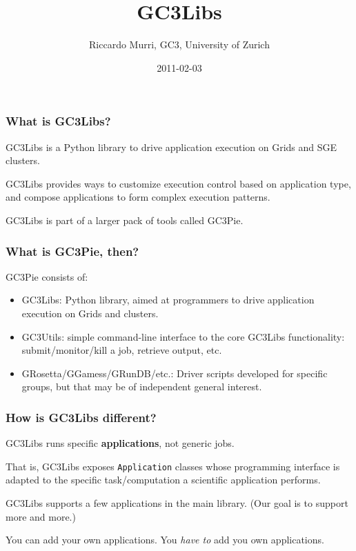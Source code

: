 \documentclass[presentation]{beamer}
\begin{document}
\title{GC3Libs}
\author{Riccardo Murri, GC3, University of Zurich}
\date{2011-02-03}
\maketitle





\begin{frame}
\frametitle{What is GC3Libs?}
\label{sec-1}


  GC3Libs is a Python library to drive application execution on Grids
  and SGE clusters.

  GC3Libs provides ways to customize execution control based on
  application type, and compose applications to form complex execution
  patterns.

  GC3Libs is part of a larger pack of tools called GC3Pie.
  
\end{frame}
\begin{frame}
\frametitle{What is GC3Pie, then?}
\label{sec-2}

  GC3Pie consists of:

\begin{itemize}
\item GC3Libs: Python library, aimed at programmers to drive application
    execution on Grids and clusters.
\item GC3Utils: simple command-line interface to the core GC3Libs
    functionality: submit/monitor/kill a job, retrieve output, etc.
\item GRosetta/GGamess/GRunDB/etc.: Driver scripts developed for
    specific groups, but that may be of independent general interest.
\end{itemize}
\end{frame}
\begin{frame}
\frametitle{How is GC3Libs different?}
\label{sec-3}


  GC3Libs runs specific \textbf{applications}, not generic jobs.

  That is, GC3Libs exposes \texttt{Application} classes whose programming
  interface is adapted to the specific task/computation a scientific
  application performs.

  GC3Libs supports a few applications in the main library.  (Our goal
  is to support more and more.)

  You can add your own applications.  You \emph{have to} add you own
  applications. 
\end{frame}
\end{document}
